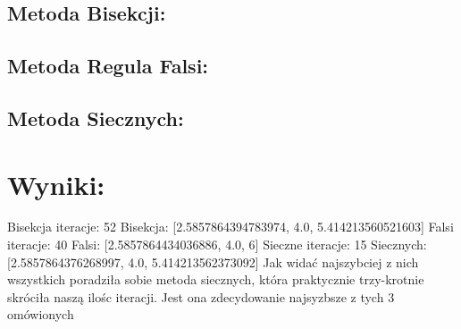 \documentclass[12pt]{article}
\begin{document}
\subsection{Metoda Bisekcji:}
\subsection{Metoda Regula Falsi:}
\subsection{Metoda Siecznych:}
\section{Wyniki:}
Bisekcja iteracje:  52\newline
Bisekcja: [2.5857864394783974, 4.0, 5.414213560521603]\newline
Falsi iteracje:  40\newline
Falsi:  [2.5857864434036886, 4.0, 6]\newline
Sieczne iteracje:  15\newline
Siecznych:  [2.5857864376268997, 4.0, 5.414213562373092]\newline
Jak widać najszybciej z nich wszystkich poradziła sobie metoda siecznych, która praktycznie trzy-krotnie skróciła naszą ilośc iteracji. Jest ona zdecydowanie najsyzbsze z tych 3 omówionych
\end{document}
